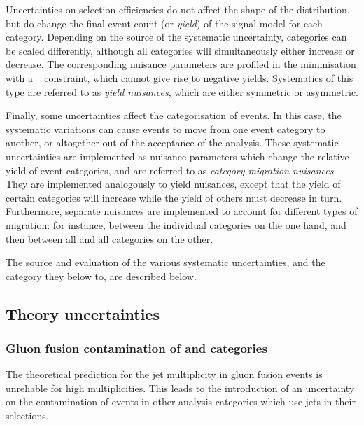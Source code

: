 Uncertainties on selection efficiencies do not affect the shape of the \mgg distribution, but do change the final event count (or \emph{yield}) of the signal model for each category. Depending on the source of the systematic uncertainty, categories can be scaled differently, although all categories will simultaneously either increase or decrease. The corresponding nuisance parameters are profiled in the \NLL minimisation with a \lnN~\cite{1987lognormal} constraint, which cannot give rise to negative yields. Systematics of this type are referred to as \emph{yield nuisances}, which are either symmetric or asymmetric. %

Finally, some uncertainties affect the categorisation of events. In this case, the systematic variations can cause events to move from one event category to another, or altogether out of the acceptance of the analysis. These systematic uncertainties are implemented as nuisance parameters which change the relative yield of event categories, and are referred to as \emph{category migration nuisances}. They are implemented analogously to yield nuisances, except that the yield of certain categories will increase while the yield of others must decrease in turn. Furthermore, separate nuisances are implemented to account for different types of migration: for instance, between the individual \VBFTag categories on the one hand, and then between all \VBFTag and all \Untagged categories on the other.

The source and evaluation of the various systematic uncertainties, and the category they below to, are described below.

\subsection{Theory uncertainties}

\subsubsection{Gluon fusion contamination of \VBFTag and \TTHTag categories}
The theoretical prediction for the jet multiplicity in gluon fusion events is unreliable for high multiplicities. This leads to the introduction of an uncertainty on the contamination of \ggH events in other analysis categories which use jets in their selections. 

